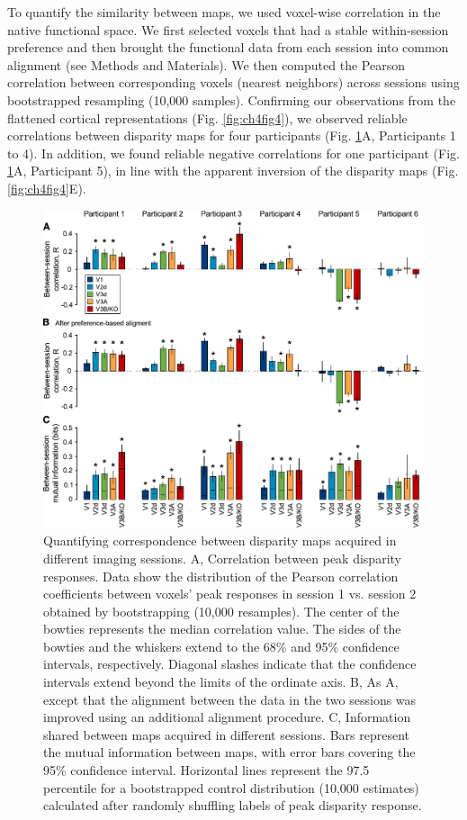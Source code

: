 To quantify the similarity between maps, we used voxel-wise correlation in the native functional space. We first selected voxels that had a stable within-session preference and then brought the functional data from each session into common alignment (see Methods and Materials). We then computed the Pearson correlation between corresponding voxels (nearest neighbors) across sessions using bootstrapped resampling (10,000 samples). Confirming our observations from the flattened cortical representations (Fig. \ref{fig:ch4fig4}), we observed reliable correlations between disparity maps for four participants (Fig. \ref{fig:ch4fig5}A, Participants 1 to 4). In addition, we found reliable negative correlations for one participant (Fig. \ref{fig:ch4fig5}A, Participant 5), in line with the apparent inversion of the disparity maps (Fig. \ref{fig:ch4fig4}E). 

\begin{figure}
  \centering
  \includegraphics[width=14cm, keepaspectratio]{fig5}
  \caption[Quantifying correspondence between disparity maps.]{Quantifying correspondence between disparity maps acquired in different imaging sessions. A, Correlation between peak disparity responses. Data show the distribution of the Pearson correlation coefficients between voxels' peak responses in session 1 vs. session 2 obtained by bootstrapping (10,000 resamples). The center of the bowties represents the median correlation value. The sides of the bowties and the whiskers extend to the 68\% and 95\% confidence intervals, respectively. Diagonal slashes indicate that the confidence intervals extend beyond the limits of the ordinate axis. B, As A, except that the alignment between the data in the two sessions was improved using an additional alignment procedure. C, Information shared between maps acquired in different sessions. Bars represent the mutual information between maps, with error bars covering the 95\% confidence interval. Horizontal lines represent the 97.5 percentile for a bootstrapped control distribution (10,000 estimates) calculated after randomly shuffling labels of peak disparity response.}
  \label{fig:ch4fig5}
\end{figure}

